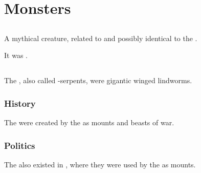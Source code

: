 \chapter{Monsters}















\section{\Chimaera}
\index{\Chimaera}
A mythical creature, related to and possibly identical to the . 

It was . 















\section{\Carth}
\index{\carth}
The \carths, also called \carth-serpents, were gigantic winged lindworms. 









\subsection{History}
The \carths were created by the \ophidians as mounts and beasts of war. 









\subsection{Politics}
The \carths also existed in \Nyx, where they were used by the \resphain as mounts. 















